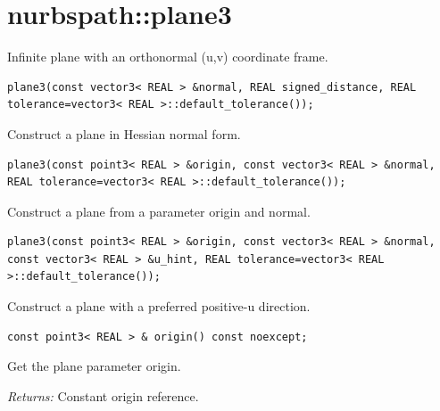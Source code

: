 \section{nurbspath::plane3}
Infinite plane with an orthonormal (u,v) coordinate frame.
\par\noindent\begin{minipage}{\linewidth}
\begin{lstlisting}[style=apireference]
plane3(const vector3< REAL > &normal, REAL signed_distance, REAL tolerance=vector3< REAL >::default_tolerance());
\end{lstlisting}
{\footnotesize Construct a plane in Hessian normal form.\par}
\end{minipage}\par\vspace{1pt}
\par\noindent\begin{minipage}{\linewidth}
\begin{lstlisting}[style=apireference]
plane3(const point3< REAL > &origin, const vector3< REAL > &normal, REAL tolerance=vector3< REAL >::default_tolerance());
\end{lstlisting}
{\footnotesize Construct a plane from a parameter origin and normal.\par}
\end{minipage}\par\vspace{1pt}
\par\noindent\begin{minipage}{\linewidth}
\begin{lstlisting}[style=apireference]
plane3(const point3< REAL > &origin, const vector3< REAL > &normal, const vector3< REAL > &u_hint, REAL tolerance=vector3< REAL >::default_tolerance());
\end{lstlisting}
{\footnotesize Construct a plane with a preferred positive-u direction.\par}
\end{minipage}\par\vspace{1pt}
\par\noindent\begin{minipage}{\linewidth}
\begin{lstlisting}[style=apireference]
const point3< REAL > & origin() const noexcept;
\end{lstlisting}
{\footnotesize Get the plane parameter origin.\par}
{\footnotesize\textit{Returns:} Constant origin reference.\par}
\end{minipage}\par\vspace{1pt}
